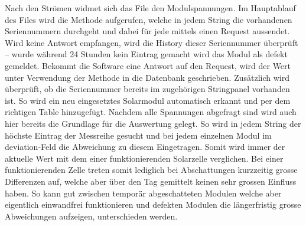 {\begin{a3pages}
{\begin{minipage}{135mm}
    Nach  den   Str\"omen  widmet   sich  das  File   den  Modulspannungen. Im
    Hauptablauf  des  Files  wird  die  Methode  
    aufgerufen,  welche   in  jedem   String  die   vorhandenen  Seriennummern
    durchgeht  und dabei  f\"ur  jede mittels  
    einen   Request  aussendet. Wird   keine  Antwort   empfangen,  wird   die
    History   dieser   Seriennummer    \"uberpr\"uft   –   wurde   w\"ahrend
    24   Stunden   kein   Eintrag   gemacht  wird   das   Modul   als   defekt
    gemeldet. Bekommt  die Software  eine Antwort  auf den  Request, wird  der
    Wert  unter  Verwendung  der  Methode  
    in   die  Datenbank   geschrieben. Zus\"atzlich  wird   \"uberpr\"uft,  ob
    die   Seriennummer   bereits   im  zugeh\"origen   Stringpanel   vorhanden
    ist. So  wird   ein  neu   eingesetztes  Solarmodul   automatisch  erkannt
    und   per     dem   richtigen   Table
    hinzugef\"ugt. Nachdem  alle  Spannungen  abgefragt sind  wird  auch  hier
    bereits die Grundlage f\"ur die Auswertung gelegt. So wird in jedem String
    der  h\"ochste  Eintrag der  Messreihe  gesucht  und bei  jedem  einzelnen
    Modul  im  deviation-Feld  die  Abweichung  zu  diesem  Eingetragen. Somit
    wird immer  der aktuelle  Wert mit  dem einer  funktionierenden Solarzelle
    verglichen. Bei einer  funktionierenden Zelle  treten somit  lediglich bei
    Abschattungen kurzzeitig  grosse Differenzen  auf, welche aber  \"uber den
    Tag gemittelt  keinen sehr  grossen Einfluss  haben. So kann  gut zwischen
    tempor\"ar  abgeschatteten  Modulen  welche  aber  eigentlich  einwandfrei
    funktionieren und defekten Modulen die l\"angerfristig grosse Abweichungen
    aufzeigen, unterschieden werden.

    \vspace*{5mm}

    \hfill{}
\end{minipage}}
\hspace*{25mm}

\end{a3pages}}



